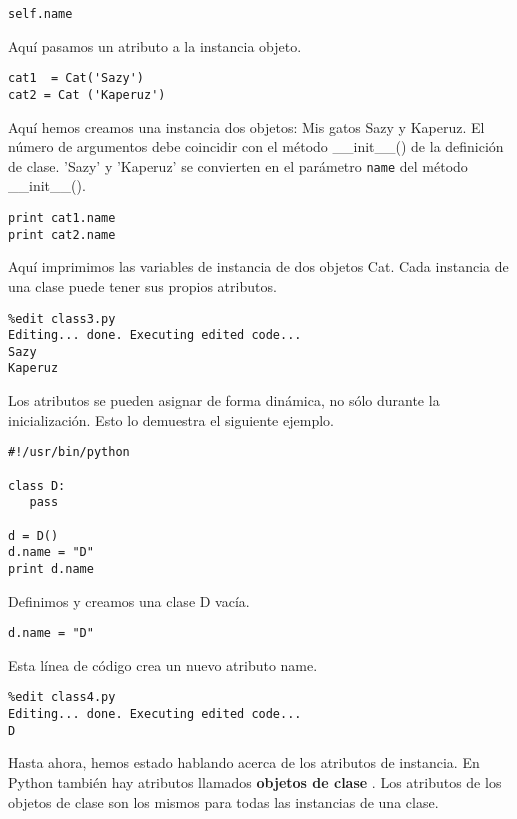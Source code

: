 \documentclass[twoside,10.5pt]{article}%
\begin{document}
\begin{verbatim}
self.name
\end{verbatim}

Aqu\'i pasamos un atributo a la instancia objeto.

\begin{verbatim}
cat1  = Cat('Sazy')
cat2 = Cat ('Kaperuz')
\end{verbatim}

\vspace{0.3cm}

Aqu\'i hemos creamos una instancia dos objetos: Mis gatos Sazy y Kaperuz. El n\'umero de argumentos debe coincidir con el m\'etodo  {\color{red}\_\_init\_\_()} de la definici\'on de clase. 'Sazy' y  'Kaperuz' se convierten en el par\'ametro \texttt{name}  del m\'etodo {\color{red}\_\_init\_\_()}.



\begin{verbatim}
print cat1.name
print cat2.name
\end{verbatim}

Aqu\'i imprimimos las variables de instancia de dos objetos Cat. Cada instancia de una clase puede tener sus propios atributos.


\begin{verbatim}
%edit class3.py
Editing... done. Executing edited code...
Sazy
Kaperuz
\end{verbatim}

Los atributos se pueden asignar de forma din\'amica, no s\'olo durante la inicializaci\'on. Esto lo demuestra el siguiente ejemplo.

\begin{verbatim}
#!/usr/bin/python

class D:
   pass

d = D()
d.name = "D"
print d.name
\end{verbatim}

Definimos y creamos una clase D vac\'ia.

\begin{verbatim}
d.name = "D"
\end{verbatim}


Esta l\'inea de c\'odigo crea un nuevo atributo name.

\begin{verbatim}
%edit class4.py
Editing... done. Executing edited code...
D
\end{verbatim}


Hasta ahora, hemos estado hablando acerca de los atributos de instancia. En Python tambi\'en hay atributos llamados \textbf{objetos de clase} . Los atributos de los objetos de clase son los mismos para todas las instancias de una clase.
\end{document}
